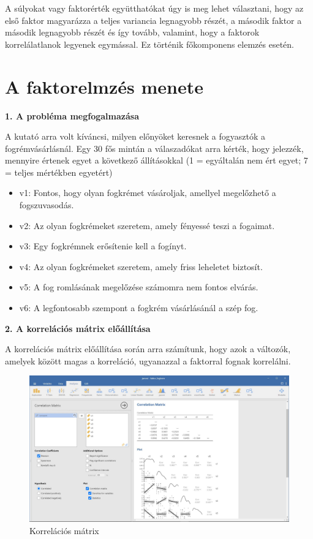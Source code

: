 \documentclass[
  letterpaper,
]{krantz}
\providecommand{\tightlist}{%
  \setlength{\itemsep}{0pt}\setlength{\parskip}{0pt}}\usepackage{longtable,booktabs,array}
\begin{document}
A súlyokat vagy faktorérték együtthatókat úgy is meg lehet választani,
hogy az első faktor magyarázza a teljes variancia legnagyobb részét, a
második faktor a második legnagyobb részét és így tovább, valamint, hogy
a faktorok korrelálatlanok legyenek egymással. Ez történik főkomponens
elemzés esetén.

\hypertarget{a-faktorelmzuxe9s-menete}{%
\section{A faktorelmzés menete}\label{a-faktorelmzuxe9s-menete}}

\textbf{1. A probléma megfogalmazása}

A kutató arra volt kíváncsi, milyen előnyöket keresnek a fogyasztók a
fogrémvásárlásnál. Egy 30 fős mintán a válaszadókat arra kérték, hogy
jelezzék, mennyire értenek egyet a következő állításokkal (1 =
egyáltalán nem ért egyet; 7 = teljes mértékben egyetért)

\begin{itemize}
\tightlist
\item
  v1: Fontos, hogy olyan fogkrémet vásároljak, amellyel megelőzhető a
  fogszuvasodás.
\item
  v2: Az olyan fogkrémeket szeretem, amely fényessé teszi a fogaimat.
\item
  v3: Egy fogkrémnek erősítenie kell a fogínyt.
\item
  v4: Az olyan fogkrémeket szeretem, amely friss leheletet biztosít.
\item
  v5: A fog romlásának megelőzése számomra nem fontos elvárás.
\item
  v6: A legfontosabb szempont a fogkrém vásárlásánál a szép fog.
\end{itemize}

\textbf{2. A korrelációs mátrix előállítása}

A korrelációs mátrix előállítása során arra számítunk, hogy azok a
változók, amelyek között magas a korreláció, ugyanazzal a faktorral
fognak korrelálni.

\begin{figure}

{\centering \includegraphics{./images/efa_fogkrem_01.jpg}

}

\caption{Korrelációs mátrix}

\end{figure}
\end{document}
